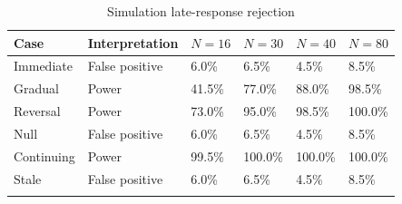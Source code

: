 \begin{table}[htbp]
\centering
{\fontsize{10}{12}\selectfont\renewcommand{\arraystretch}{1.22}\setlength{\tabcolsep}{4pt}
\begin{tabularx}{\linewidth}{@{}L{25mm}L{34mm}C{23mm}C{23mm}C{23mm}X@{}}
\toprule{}
\textbf{Case} & \textbf{Interpretation} & \textbf{$N=16$} & \textbf{$N=30$} & \textbf{$N=40$} & \textbf{$N=80$} \\ \midrule
Immediate & False positive & 6.0\% & 6.5\% & 4.5\% & 8.5\% \\ \hline
Gradual & Power & 41.5\% & 77.0\% & 88.0\% & 98.5\% \\ \hline
Reversal & Power & 73.0\% & 95.0\% & 98.5\% & 100.0\% \\ \hline
Null & False positive & 6.0\% & 6.5\% & 4.5\% & 8.5\% \\ \hline
Continuing & Power & 99.5\% & 100.0\% & 100.0\% & 100.0\% \\ \hline
Stale & False positive & 6.0\% & 6.5\% & 4.5\% & 8.5\% \\ \hline
{}\bottomrule\end{tabularx}}
\caption[Simulation late-response rejection]{Simulation late-response rejection}\label{tab:synthetic-power}
\end{table}

